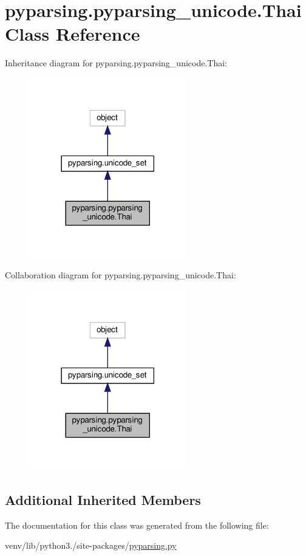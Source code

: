 \hypertarget{classpyparsing_1_1pyparsing__unicode_1_1Thai}{}\section{pyparsing.\+pyparsing\+\_\+unicode.\+Thai Class Reference}
\label{classpyparsing_1_1pyparsing__unicode_1_1Thai}


Inheritance diagram for pyparsing.\+pyparsing\+\_\+unicode.\+Thai\+:
\nopagebreak
\begin{figure}[H]
\begin{center}
\leavevmode
\includegraphics[width=194pt]{classpyparsing_1_1pyparsing__unicode_1_1Thai__inherit__graph}
\end{center}
\end{figure}


Collaboration diagram for pyparsing.\+pyparsing\+\_\+unicode.\+Thai\+:
\nopagebreak
\begin{figure}[H]
\begin{center}
\leavevmode
\includegraphics[width=194pt]{classpyparsing_1_1pyparsing__unicode_1_1Thai__coll__graph}
\end{center}
\end{figure}
\subsection*{Additional Inherited Members}


The documentation for this class was generated from the following file\+:\begin{DoxyCompactItemize}
\item 
venv/lib/python3./site-\/packages/\hyperlink{pyparsing_8py}{pyparsing.\+py}\end{DoxyCompactItemize}
